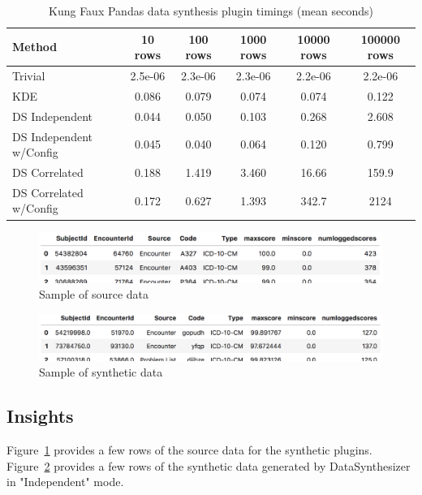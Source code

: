 \documentclass{amia}
\begin{document}
\begin{table}
	\caption{Kung Faux Pandas data synthesis plugin timings (mean seconds)}
	\label{timing_results}
	\centering
	\begin{tabular}{l c c c c c}
		\toprule 
		Method & 10 rows & 100 rows & 1000 rows & 10000 rows & 100000 rows\\ 
		\midrule 
		Trivial & 2.5e-06 & 2.3e-06 & 2.3e-06 & 2.2e-06 & 2.2e-06 \\ 
		KDE & 0.086 & 0.079 & 0.074 & 0.074 & 0.122 \\ 
		DS Independent & 0.044 & 0.050 & 0.103 & 0.268 & 2.608 \\ 
		DS Independent w/Config & 0.045 & 0.040 & 0.064 & 0.120 & 0.799 \\
		DS Correlated & 0.188 & 1.419 & 3.460 & 16.66 & 159.9 \\ 
		DS Correlated w/Config & 0.172 & 0.627 & 1.393 & 342.7 & 2124 \\ 
		\midrule
	\end{tabular}
\end{table}

\begin{figure}[ht]
  \centering
  \includegraphics[width=120mm]{sample_source_data}
  \caption{Sample of source data}
  \label{fig:sample_source_data}
\end{figure}
\begin{figure}[ht]
  \centering
  \includegraphics[width=120mm]{sample_synthetic_data}
  \caption{Sample of synthetic data}
  \label{fig:sample_synthetic_data}
\end{figure}

\subsection{Insights}

Figure~\ref{fig:sample_source_data} provides a few rows of the source data for the synthetic plugins. Figure~\ref{fig:sample_synthetic_data} provides a few rows of the synthetic data generated by DataSynthesizer in "Independent" mode.
\end{document}
